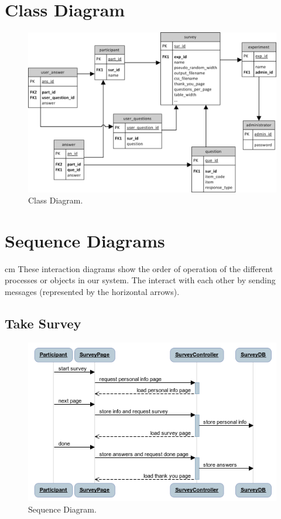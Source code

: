 \documentclass[a4paper,12pt,oneside]{report}
\begin{document}
\section{Class Diagram}
\vskip 2cm
\begin{figure}[h!]
  \begin{center}
   \includegraphics[width=15.5cm]{pics/class.png}
  \end{center}
\caption{Class Diagram.}
\end{figure}

\newpage

\section{Sequence Diagrams}
 cm
These interaction diagrams show the order of operation of the different processes or objects in our system. The interact with each other by sending messages (represented by the horizontal arrows).
\vskip 1cm
\subsection{Take Survey}
\vskip 1cm
\begin{figure}[!hp]
  \begin{center}
   \includegraphics[width=11.5cm]{pics/take_survey.png}
  \end{center}
\caption{Sequence Diagram.}
\end{figure}
\newpage
\end{document}
